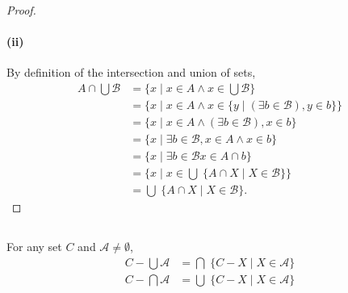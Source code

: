 \documentclass{report}
\begin{document}
\begin{proof}
  \paragraph{(ii)}%

    By definition of the intersection and union of sets,
      \begin{align*}
        A \cap \bigcup \mathscr{B}
          & = \{ x \mid x \in A \land x \in \bigcup \mathscr{B} \} \\
          & = \{ x \mid x \in A \land
            x \in \{ y \mid (\exists b \in \mathscr{B}), y \in b \}\} \\
          & = \{ x \mid x \in A \land (\exists b \in \mathscr{B}), x \in b \} \\
          & = \{ x \mid \exists b \in \mathscr{B}, x \in A \land x \in b \} \\
          & = \{ x \mid \exists b \in \mathscr{B} x \in A \cap b \} \\
          & = \{ x \mid
            x \in \bigcup\; \{ A \cap X \mid X \in \mathscr{B} \}\} \\
          & = \bigcup\; \{ A \cap X \mid X \in \mathscr{B} \}.
      \end{align*}

\end{proof}

\subsection{}%
\label{sub:general-de-morgans-laws}

For any set $C$ and $\mathscr{A} \neq \emptyset$,
  \begin{align*}
    C - \bigcup \mathscr{A} & = \bigcap\; \{ C - X \mid X \in \mathscr{A} \} \\
    C - \bigcap \mathscr{A} & = \bigcup\; \{ C - X \mid X \in \mathscr{A} \}
  \end{align*}
\end{document}
